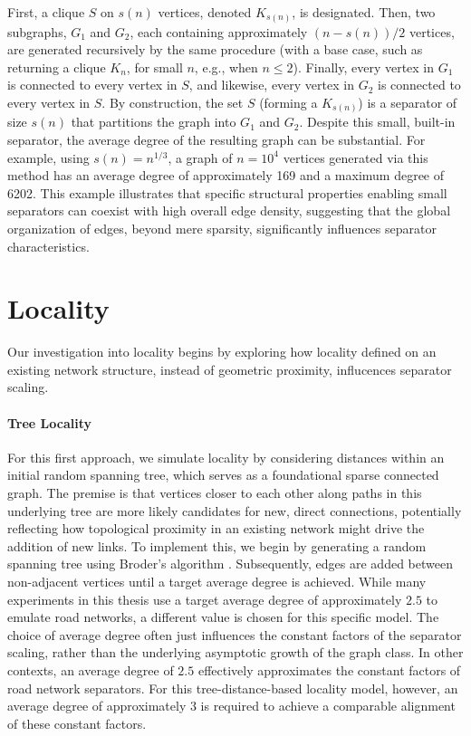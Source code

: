 First, a clique \(S\) on \(s(n)\) vertices, denoted \(K_{s(n)}\), is designated.
Then, two subgraphs, \(G_1\) and \(G_2\), each containing approximately \((n-s(n))/2\) vertices, are generated recursively by the same procedure (with a base case, such as returning a clique \(K_n\), for small \(n\), e.g., when \(n \le 2\)).
Finally, every vertex in \(G_1\) is connected to every vertex in \(S\), and likewise, every vertex in \(G_2\) is connected to every vertex in \(S\).
By construction, the set \(S\) (forming a \(K_{s(n)}\)) is a separator of size \(s(n)\) that partitions the graph into \(G_1\) and \(G_2\).
Despite this small, built-in separator, the average degree of the resulting graph can be substantial.
For example, using \(s(n) = n^{1/3}\), a graph of \(n=10^4\) vertices generated via this method has an average degree of approximately 169 and a maximum degree of 6202.
This example illustrates that specific structural properties enabling small separators can coexist with high overall edge density, suggesting that the global organization of edges, beyond mere sparsity, significantly influences separator characteristics.

\section{Locality}
\label{sec:synthetic:locality}

Our investigation into locality begins by exploring how locality defined on an existing network structure, instead of geometric proximity, influcences separator scaling.

\paragraph{Tree Locality}

For this first approach, we simulate locality by considering distances within an initial random spanning tree, which serves as a foundational sparse connected graph.
The premise is that vertices closer to each other along paths in this underlying tree are more likely candidates for new, direct connections, potentially reflecting how topological proximity in an existing network might drive the addition of new links.
To implement this, we begin by generating a random spanning tree using Broder's algorithm \cite{broder_generating_1989}.
Subsequently, edges are added between non-adjacent vertices until a target average degree is achieved.
While many experiments in this thesis use a target average degree of approximately \(2.5\) to emulate road networks, a different value is chosen for this specific model.
The choice of average degree often just influences the constant factors of the separator scaling, rather than the underlying asymptotic growth of the graph class.
In other contexts, an average degree of \(2.5\) effectively approximates the constant factors of road network separators.
For this tree-distance-based locality model, however, an average degree of approximately 3 is required to achieve a comparable alignment of these constant factors.

